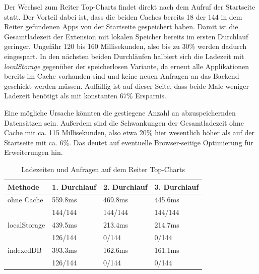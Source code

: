 Der Wechsel zum Reiter \glqq Top-Charts \grqq{} findet direkt nach dem Aufruf der Startseite statt. Der Vorteil dabei ist, dass die beiden Caches bereits 18 der 144 in dem Reiter gefundenen Apps von der Startseite gespeichert haben. Damit ist die Gesamtladezeit der Extension mit lokalen Speicher bereits im ersten Durchlauf geringer. Ungefähr 120 bis 160 Millisekunden, also bis zu 30\% werden dadurch eingespart. In den nächsten beiden Durchläufen halbiert sich die Ladezeit mit \textit{localStorage} gegenüber der speicherlosen Variante, da erneut alle Applikationen bereits im Cache vorhanden sind und keine neuen Anfragen an das Backend geschickt werden müssen. Auffällig ist auf dieser Seite, dass  beide Male weniger Ladezeit benötigt als  mit konstanten 67\% Ersparnis. 

Eine mögliche Ursache könnten die gestiegene Anzahl an abzuspeichernden Datensätzen sein. Außerdem sind die Schwankungen der Gesamtladezeit ohne Cache mit ca. 115 Millisekunden, also etwa 20\% hier wesentlich höher als auf der Startseite mit ca. 6\%. Das deutet auf eventuelle Browser-seitige Optimierung für Erweiterungen hin.
\begin{table}[h]
	\begin{tabular}{p{2.8cm}C{3.0cm}C{2.8cm}C{3.0cm}}
		\toprule
		\textbf{Methode}	&	\textbf{1. Durchlauf}	&	\textbf{2. Durchlauf}	& \textbf{3. Durchlauf}\\
		\midrule
		ohne Cache	&	559.8ms	&	469.8ms	&	445.6ms	\\
		&	144/144	&	144/144	&	144/144	\\
		
		localStorage	&	439.5ms	&	213.4ms	&	214.7ms	\\
		&	126/144		&	0/144	&	0/144	\\
		
		indexedDB	&	393.3ms	&	162.6ms	&	161.1ms	\\
		&	126/144	&	0/144	&	0/144	\\
		
		\bottomrule
	\end{tabular}
	\caption{Ladezeiten und Anfragen auf dem Reiter \glqq Top-Charts \grqq{}}
	\label{ergebnis22}
\end{table}

